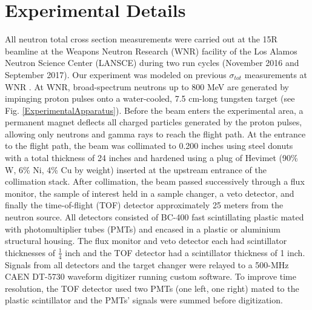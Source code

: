 \documentclass[twocolumn,secnumarabic,amssymb, nobibnotes, aps, prl,
superscriptaddress, nobalancelastpage]{revtex4}
\newcommand{\tots}{\ensuremath{\sigma_{tot}}\,\,}
\begin{document}
\section{Experimental Details}
All neutron total cross section measurements were carried out at the 15R
beamline at the Weapons Neutron Research (WNR) facility of the Los Alamos
Neutron Science Center (LANSCE) during two run cycles (November 2016 and
September 2017). Our experiment was modeled on previous
\tots measurements at WNR \cite{Finlay1993,Abfalterer2001,Shane2010}. At WNR,
broad-spectrum neutrons up
to 800 MeV are generated by impinging proton pulses onto a water-cooled, 7.5
cm-long tungsten target (see Fig. \ref{ExperimentalApparatus}). Before the beam
enters the experimental area, a
permanent magnet deflects all charged particles generated by the proton pulses, 
allowing only neutrons and gamma rays to reach the flight path. At the
entrance to the flight path, the beam was collimated to 0.200 inches using steel
donuts with a total thickness of 24 inches and hardened using a plug of Hevimet (90\% W, 6\% 
Ni, 4\% Cu by weight) inserted at the upstream entrance of the
collimation stack. After collimation, the beam passed successively through a flux 
monitor, the sample of interest held in a sample changer, a veto detector, and finally the 
time-of-flight (TOF) detector approximately 25 meters from the neutron source.
All detectors consisted of BC-400 fast scintillating plastic mated with 
photomultiplier tubes (PMTs) and encased in a plastic or
aluminium structural housing. The flux monitor and veto detector each had
scintillator thicknesses of $\frac{1}{4}$ inch and the TOF detector had a
scintillator thickness of 1 inch. Signals from all detectors and
the target changer were relayed to a 500-MHz CAEN DT-5730 waveform digitizer
running custom software. To improve time resolution, the TOF detector used two
PMTs (one left, one right) mated to the plastic scintillator and the PMTs' signals were 
summed before digitization.
\end{document}

